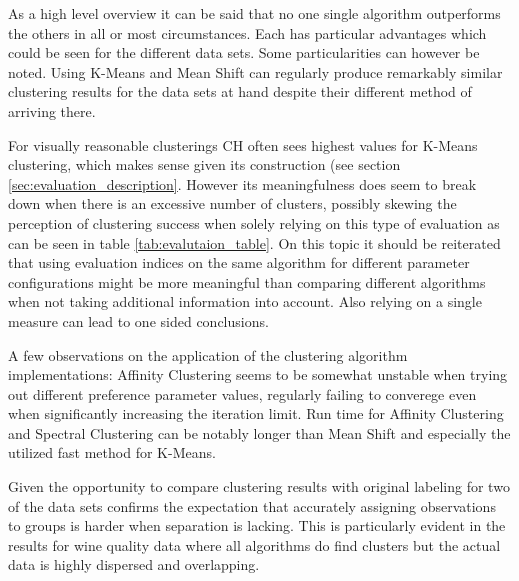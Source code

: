 As a high level overview it can be said that no one single algorithm outperforms the others in all or most circumstances. Each has particular advantages which could be seen for the different data sets. Some particularities can however be noted. Using K-Means and Mean Shift can regularly produce remarkably similar clustering results for the data sets at hand despite their different method of arriving there. 

For visually reasonable clusterings \gls{CH} often sees highest values for K-Means clustering, which makes sense given its construction (see section \ref{sec:evaluation_description}. However its meaningfulness does seem to break down when there is an excessive number of clusters, possibly skewing the perception of clustering success when solely relying on this type of evaluation as can be seen in table \ref{tab:evalutaion_table}. On this topic it should be reiterated that using evaluation indices on the same algorithm for different parameter configurations might be more meaningful than comparing different algorithms when not taking additional information into account. Also relying on a single measure can lead to one sided conclusions.

A few observations on the application of the clustering algorithm implementations: Affinity Clustering seems to be somewhat unstable when trying out different preference parameter values, regularly failing to converege even when significantly increasing the iteration limit. Run time for Affinity Clustering and Spectral Clustering can be notably longer than Mean Shift and especially the utilized fast method for K-Means.

Given the opportunity to compare clustering results with original labeling for two of the data sets confirms the expectation that accurately assigning observations to groups is harder when separation is lacking. This is particularly evident in the results for wine quality data where all algorithms do find clusters but the actual data is highly dispersed and overlapping.
